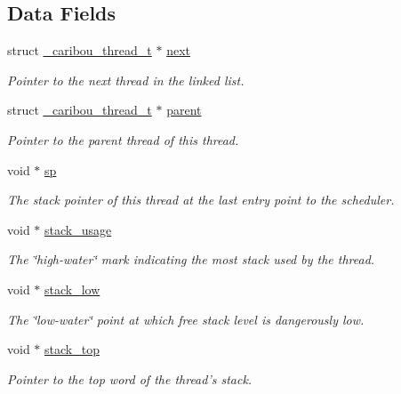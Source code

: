 \subsection*{Data Fields}
\begin{DoxyCompactItemize}
\item 
struct \hyperlink{struct__caribou__thread__t}{\-\_\-caribou\-\_\-thread\-\_\-t} $\ast$ \hyperlink{struct__caribou__thread__t_a584ef536a58df0aa0e097add451a66e4}{next}
\begin{DoxyCompactList}\small\item\em Pointer to the next thread in the linked list. \end{DoxyCompactList}\item 
struct \hyperlink{struct__caribou__thread__t}{\-\_\-caribou\-\_\-thread\-\_\-t} $\ast$ \hyperlink{struct__caribou__thread__t_a1ecb216e2a946081e642ad98bbbbd9e7}{parent}
\begin{DoxyCompactList}\small\item\em Pointer to the parent thread of this thread. \end{DoxyCompactList}\item 
void $\ast$ \hyperlink{struct__caribou__thread__t_aceaf2820170f1252157576769bf04672}{sp}
\begin{DoxyCompactList}\small\item\em The stack pointer of this thread at the last entry point to the scheduler. \end{DoxyCompactList}\item 
void $\ast$ \hyperlink{struct__caribou__thread__t_af4ac7e484b60887e54aeff966cf366da}{stack\-\_\-usage}
\begin{DoxyCompactList}\small\item\em The \char`\"{}high-\/water\char`\"{} mark indicating the most stack used by the thread. \end{DoxyCompactList}\item 
void $\ast$ \hyperlink{struct__caribou__thread__t_a09703c14662151cf8b073626e9144279}{stack\-\_\-low}
\begin{DoxyCompactList}\small\item\em The \char`\"{}low-\/water\char`\"{} point at which free stack level is dangerously low. \end{DoxyCompactList}\item 
void $\ast$ \hyperlink{struct__caribou__thread__t_a82a114a6b3fb2c733159562ba9442eca}{stack\-\_\-top}
\begin{DoxyCompactList}\small\item\em Pointer to the top word of the thread's stack. \end{DoxyCompactList}\item 

\end{DoxyCompactItemize}
